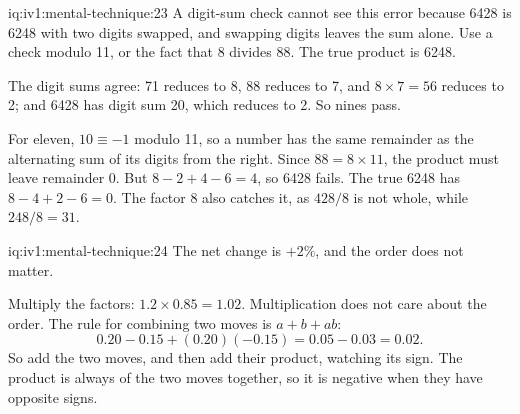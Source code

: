 \begin{solution}{iq:iv1:mental-technique:23}
A digit-sum check cannot see this error because 6428 is 6248 with two digits swapped, and swapping digits leaves the sum alone. Use a check modulo 11, or the fact that 8 divides 88. The true product is 6248.

The digit sums agree: 71 reduces to 8, 88 reduces to 7, and $8 \times 7 = 56$ reduces to 2; and 6428 has digit sum 20, which reduces to 2. So nines pass.

For eleven, $10 \equiv -1$ modulo 11, so a number has the same remainder as the alternating sum of its digits from the right. Since $88 = 8 \times 11$, the product must leave remainder 0. But $8 - 2 + 4 - 6 = 4$, so 6428 fails. The true 6248 has $8 - 4 + 2 - 6 = 0$. The factor 8 also catches it, as $428 / 8$ is not whole, while $248 / 8 = 31$.

\end{solution}

\begin{solution}{iq:iv1:mental-technique:24}
The net change is $+2\%$, and the order does not matter.

Multiply the factors: $1.2 \times 0.85 = 1.02$. Multiplication does not care about the order. The rule for combining two moves is $a + b + ab$:
\[
0.20 - 0.15 + (0.20)(-0.15) = 0.05 - 0.03 = 0.02.
\]
So add the two moves, and then add their product, watching its sign. The product is always of the two moves together, so it is negative when they have opposite signs.

\end{solution}

